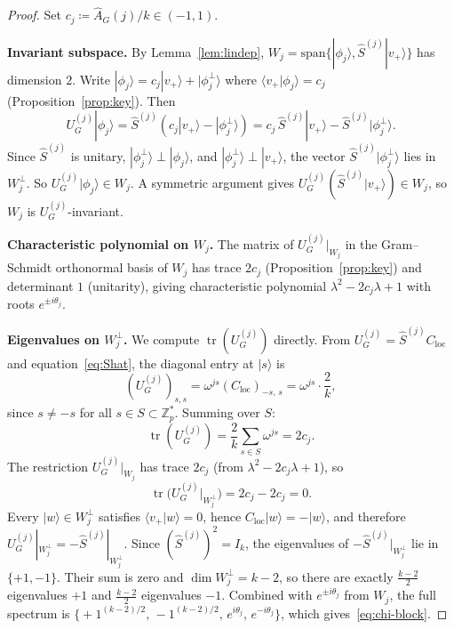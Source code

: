 \documentclass[10pt,a4paper]{amsart}
\newcommand{\Ahat}{\widehat{A}_G}
\newcommand{\Shat}{\hat{S}^{(j)}}
\newcommand{\Uj}{U_G^{(j)}}
\newcommand{\Z}{\mathbb{Z}}
\newcommand{\braket}[2]{\langle #1 | #2 \rangle}
\newcommand{\eqdef}{\coloneqq}
\newcommand{\ket}[1]{|#1\rangle}
\newcommand{\phij}{\phi_j}
\newcommand{\vplus}{v_+}
\begin{document}
\begin{proof}
  Set $c_j \eqdef \Ahat(j)/k \in (-1,1)$.

  \medskip
  \noindent\textbf{Invariant subspace.}
  By Lemma~\ref{lem:lindep}, $W_j = \mathrm{span}\{\ket{\phij},
  \Shat\ket{\vplus}\}$ has dimension $2$.  Write
  $\ket{\phij} = c_j\ket{\vplus}+\ket{\phij^\perp}$ where
  $\braket{\vplus}{\phij}=c_j$ (Proposition~\ref{prop:key}).  Then
  \[
    \Uj\ket{\phij}
    = \Shat(c_j\ket{\vplus}-\ket{\phij^\perp})
    = c_j\,\Shat\ket{\vplus} - \Shat\ket{\phij^\perp}.
  \]
  Since $\Shat$ is unitary, $\ket{\phij^\perp}\perp\ket{\phij}$, and
  $\ket{\phij^\perp}\perp\ket{\vplus}$, the vector $\Shat\ket{\phij^\perp}$
  lies in $W_j^\perp$.  So $\Uj\ket{\phij}\in W_j$.  A symmetric argument
  gives $\Uj(\Shat\ket{\vplus})\in W_j$, so $W_j$ is $\Uj$-invariant.

  \medskip
  \noindent\textbf{Characteristic polynomial on $W_j$.}
  The matrix of $\Uj|_{W_j}$ in the Gram--Schmidt orthonormal basis of
  $W_j$ has trace $2c_j$ (Proposition~\ref{prop:key}) and determinant $1$
  (unitarity), giving characteristic polynomial
  $\lambda^2-2c_j\lambda+1$ with roots $e^{\pm i\theta_j}$.

  \medskip
  \noindent\textbf{Eigenvalues on $W_j^\perp$.}
  We compute $\operatorname{tr}(\Uj)$ directly.  From
  $\Uj = \Shat C_{\mathrm{loc}}$ and equation~\eqref{eq:Shat}, the
  diagonal entry at $\ket{s}$ is
  \[
    (\Uj)_{s,s} = \omega^{js}(C_{\mathrm{loc}})_{-s,\,s}
                = \omega^{js}\cdot\frac{2}{k},
  \]
  since $s \neq -s$ for all $s \in S \subset \Z_p^*$.
  Summing over $S$:
  \[
    \operatorname{tr}(\Uj) = \frac{2}{k}\sum_{s\in S}\omega^{js} = 2c_j.
  \]
  The restriction $\Uj|_{W_j}$ has trace $2c_j$ (from
  $\lambda^2-2c_j\lambda+1$), so
  \[
    \operatorname{tr}\!\bigl(\Uj|_{W_j^\perp}\bigr) = 2c_j - 2c_j = 0.
  \]
  Every $\ket{w}\in W_j^\perp$ satisfies $\braket{\vplus}{w}=0$, hence
  $C_{\mathrm{loc}}\ket{w}=-\ket{w}$, and therefore
  $\Uj|_{W_j^\perp} = -\Shat|_{W_j^\perp}$.
  Since $(\Shat)^2 = I_k$, the eigenvalues of $-\Shat|_{W_j^\perp}$ lie
  in $\{+1,-1\}$.  Their sum is zero and
  $\dim W_j^\perp = k-2$, so there are exactly $\tfrac{k-2}{2}$
  eigenvalues $+1$ and $\tfrac{k-2}{2}$ eigenvalues $-1$.
  Combined with $e^{\pm i\theta_j}$ from $W_j$, the full spectrum is
  $\bigl\{+1^{(k-2)/2},\,-1^{(k-2)/2},\,e^{i\theta_j},\,e^{-i\theta_j}
  \bigr\}$, which gives~\eqref{eq:chi-block}.
\end{proof}
\end{document}
